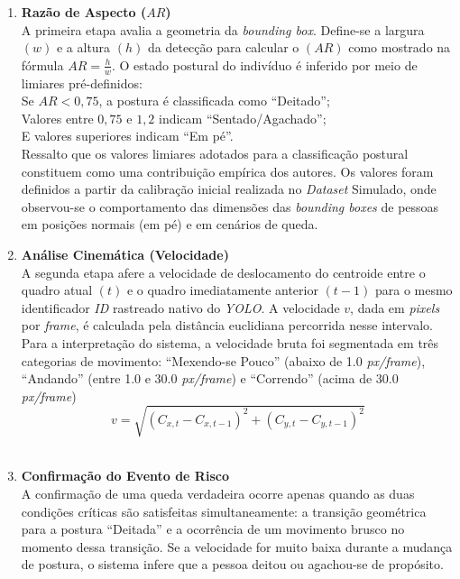\documentclass[12pt]{article}
\begin{document}
\begin{enumerate}[label=\Alph*.]

    \item \textbf{Razão de Aspecto ($AR$)}\\
    A primeira etapa avalia a geometria da \textit{bounding box}. Define-se a largura $(w)$
    e a altura $(h)$ da detecção para calcular o $(AR)$ como mostrado na fórmula $AR = \frac{h}{w}$. 
    O estado postural do indivíduo é inferido por meio de limiares pré-definidos:\\
    Se $AR < 0,75$, a postura é classificada como ``Deitado'';\\ 
    Valores entre $0,75$ e $1,2$ indicam ``Sentado/Agachado'';\\ 
    E valores superiores indicam ``Em pé''.
    \\
    
    Ressalto que os valores limiares adotados para a classificação postural constituem como uma contribuição
    empírica dos autores. Os valores foram definidos a partir da calibração inicial realizada no \textit{Dataset}
    Simulado, onde observou-se o comportamento das dimensões das \textit{bounding boxes} de pessoas em posições
    normais (em pé) e em cenários de queda.
    \\
    \item \textbf{Análise Cinemática (Velocidade)} \\
    A segunda etapa afere a velocidade de deslocamento do centroide entre o quadro atual $(t)$ e o quadro
    imediatamente anterior $(t - 1)$ para o mesmo identificador \textit{ID} rastreado nativo do \textit{YOLO}.
    A velocidade $v$, dada em \textit{pixels} por \textit{frame}, é calculada pela distância euclidiana
    percorrida nesse intervalo. Para a interpretação do sistema, a velocidade bruta foi segmentada em três
    categorias de movimento: ``Mexendo-se Pouco'' (abaixo de 1.0 \textit{px/frame}), ``Andando'' (entre 1.0
    e 30.0 \textit{px/frame}) e ``Correndo'' (acima de 30.0 \textit{px/frame})
    \begin{equation}
        v = \sqrt{(C_{x,t} - C_{x,t-1})^2 + (C_{y,t} - C_{y,t-1})^2}
    \end{equation}
    \\
    \item \textbf{Confirmação do Evento de Risco}\\
    A confirmação de uma queda verdadeira ocorre apenas quando as duas condições críticas são satisfeitas
    simultaneamente: a transição geométrica para a postura ``Deitada'' e a ocorrência de um movimento brusco 
    no momento dessa transição. Se a velocidade for muito baixa durante a mudança de postura, o sistema 
    infere que a pessoa deitou ou agachou-se de propósito.
    

\end{enumerate}
\end{document}
